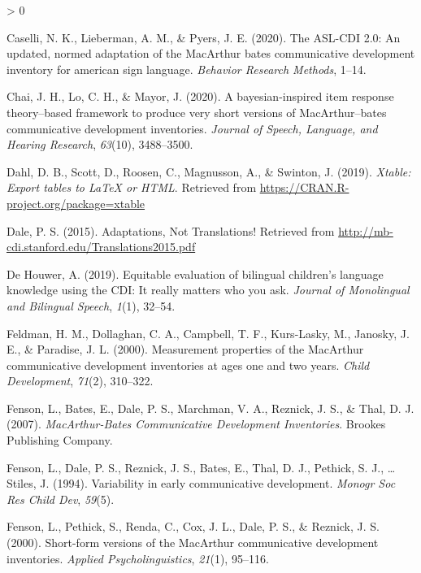 \documentclass[
  english,
  ,man,floatsintext]{apa6}
\newlength{\cslhangindent}
\newenvironment{CSLReferences}[2] %
 {%
  \setlength{\parindent}{0pt}
  \ifodd #1 \everypar{\setlength{\hangindent}{\cslhangindent}}\ignorespaces\fi
  \ifnum #2 > 0
  \setlength{\parskip}{#2\baselineskip}
  \fi
 }%
 {}
\begin{document}
\begin{CSLReferences}{1}{0}
\leavevmode\hypertarget{ref-Caselli2020}{}%
Caselli, N. K., Lieberman, A. M., \& Pyers, J. E. (2020). The ASL-CDI 2.0: An updated, normed adaptation of the MacArthur bates communicative development inventory for american sign language. \emph{Behavior Research Methods}, 1--14.

\leavevmode\hypertarget{ref-Chai2020}{}%
Chai, J. H., Lo, C. H., \& Mayor, J. (2020). A bayesian-inspired item response theory--based framework to produce very short versions of MacArthur--bates communicative development inventories. \emph{Journal of Speech, Language, and Hearing Research}, \emph{63}(10), 3488--3500.

\leavevmode\hypertarget{ref-R-xtable}{}%
Dahl, D. B., Scott, D., Roosen, C., Magnusson, A., \& Swinton, J. (2019). \emph{Xtable: Export tables to LaTeX or HTML}. Retrieved from \url{https://CRAN.R-project.org/package=xtable}

\leavevmode\hypertarget{ref-dale2015}{}%
Dale, P. S. (2015). {Adaptations, Not Translations!} Retrieved from \url{http://mb-cdi.stanford.edu/Translations2015.pdf}

\leavevmode\hypertarget{ref-DeHouwer2019}{}%
De Houwer, A. (2019). Equitable evaluation of bilingual children's language knowledge using the CDI: It really matters who you ask. \emph{Journal of Monolingual and Bilingual Speech}, \emph{1}(1), 32--54.

\leavevmode\hypertarget{ref-feldman2000}{}%
Feldman, H. M., Dollaghan, C. A., Campbell, T. F., Kurs-Lasky, M., Janosky, J. E., \& Paradise, J. L. (2000). Measurement properties of the MacArthur communicative development inventories at ages one and two years. \emph{Child Development}, \emph{71}(2), 310--322.

\leavevmode\hypertarget{ref-fenson2007}{}%
Fenson, L., Bates, E., Dale, P. S., Marchman, V. A., Reznick, J. S., \& Thal, D. J. (2007). \emph{Mac{A}rthur-{B}ates {C}ommunicative {D}evelopment {I}nventories}. Brookes Publishing Company.

\leavevmode\hypertarget{ref-fenson1994}{}%
Fenson, L., Dale, P. S., Reznick, J. S., Bates, E., Thal, D. J., Pethick, S. J., \ldots{} Stiles, J. (1994). Variability in early communicative development. \emph{Monogr Soc Res Child Dev}, \emph{59}(5).

\leavevmode\hypertarget{ref-fenson2000b}{}%
Fenson, L., Pethick, S., Renda, C., Cox, J. L., Dale, P. S., \& Reznick, J. S. (2000). Short-form versions of the MacArthur communicative development inventories. \emph{Applied Psycholinguistics}, \emph{21}(1), 95--116.


\end{CSLReferences}
\end{document}
